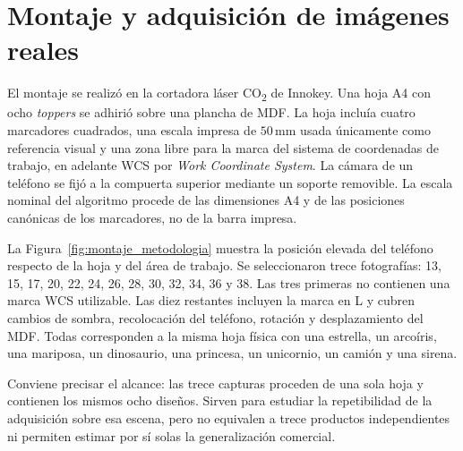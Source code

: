 \section{Montaje y adquisición de imágenes reales}

El montaje se realizó en la cortadora láser CO\textsubscript{2} de Innokey. Una hoja A4 con ocho \textit{toppers} se adhirió sobre una plancha de MDF. La hoja incluía cuatro marcadores cuadrados, una escala impresa de $50\,\text{mm}$ usada únicamente como referencia visual y una zona libre para la marca del sistema de coordenadas de trabajo, en adelante WCS por \textit{Work Coordinate System}. La cámara de un teléfono se fijó a la compuerta superior mediante un soporte removible. La escala nominal del algoritmo procede de las dimensiones A4 y de las posiciones canónicas de los marcadores, no de la barra impresa.


La Figura~\ref{fig:montaje_metodologia} muestra la posición elevada del teléfono respecto de la hoja y del área de trabajo. Se seleccionaron trece fotografías: 13, 15, 17, 20, 22, 24, 26, 28, 30, 32, 34, 36 y 38. Las tres primeras no contienen una marca WCS utilizable. Las diez restantes incluyen la marca en L y cubren cambios de sombra, recolocación del teléfono, rotación y desplazamiento del MDF. Todas corresponden a la misma hoja física con una estrella, un arcoíris, una mariposa, un dinosaurio, una princesa, un unicornio, un camión y una sirena.

Conviene precisar el alcance: las trece capturas proceden de una sola hoja y contienen los mismos ocho diseños. Sirven para estudiar la repetibilidad de la adquisición sobre esa escena, pero no equivalen a trece productos independientes ni permiten estimar por sí solas la generalización comercial.


